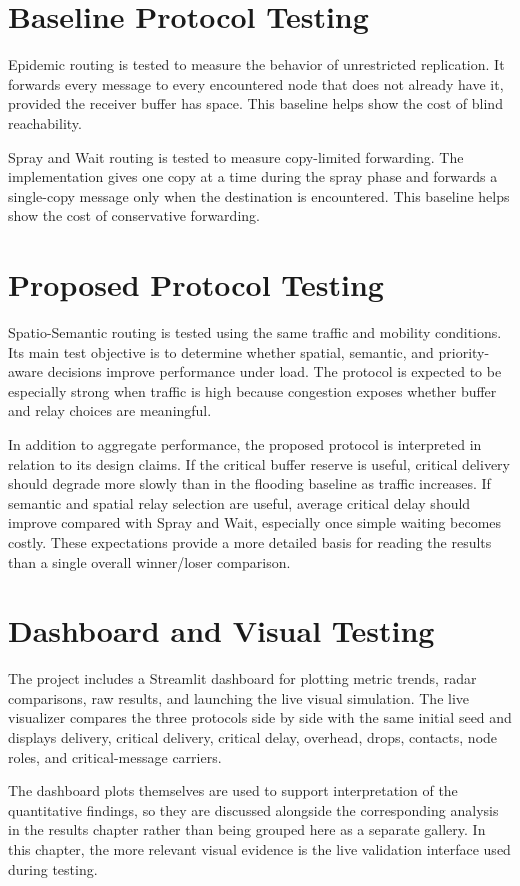 \section{Baseline Protocol Testing}
Epidemic routing is tested to measure the behavior of unrestricted replication. It forwards every message to every encountered node that does not already have it, provided the receiver buffer has space. This baseline helps show the cost of blind reachability.

Spray and Wait routing is tested to measure copy-limited forwarding. The implementation gives one copy at a time during the spray phase and forwards a single-copy message only when the destination is encountered. This baseline helps show the cost of conservative forwarding.

\section{Proposed Protocol Testing}
Spatio-Semantic routing is tested using the same traffic and mobility conditions. Its main test objective is to determine whether spatial, semantic, and priority-aware decisions improve performance under load. The protocol is expected to be especially strong when traffic is high because congestion exposes whether buffer and relay choices are meaningful.

In addition to aggregate performance, the proposed protocol is interpreted in relation to its design claims. If the critical buffer reserve is useful, critical delivery should degrade more slowly than in the flooding baseline as traffic increases. If semantic and spatial relay selection are useful, average critical delay should improve compared with Spray and Wait, especially once simple waiting becomes costly. These expectations provide a more detailed basis for reading the results than a single overall winner/loser comparison.

\section{Dashboard and Visual Testing}
The project includes a Streamlit dashboard for plotting metric trends, radar comparisons, raw results, and launching the live visual simulation. The live visualizer compares the three protocols side by side with the same initial seed and displays delivery, critical delivery, critical delay, overhead, drops, contacts, node roles, and critical-message carriers.

The dashboard plots themselves are used to support interpretation of the quantitative findings, so they are discussed alongside the corresponding analysis in the results chapter rather than being grouped here as a separate gallery. In this chapter, the more relevant visual evidence is the live validation interface used during testing.

